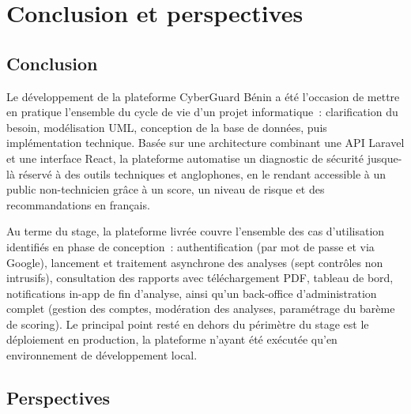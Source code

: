 \chapter*{Conclusion et perspectives}

\section{Conclusion}

Le d\'eveloppement de la plateforme CyberGuard B\'enin a \'et\'e l'occasion de mettre
en pratique l'ensemble du cycle de vie d'un projet informatique~: clarification
du besoin, mod\'elisation UML, conception de la base de donn\'ees, puis
impl\'ementation technique. Bas\'ee sur une architecture combinant une API Laravel
et une interface React, la plateforme automatise un diagnostic de s\'ecurit\'e
jusque-l\`a r\'eserv\'e \`a des outils techniques et anglophones, en le rendant
accessible \`a un public non-technicien gr\^ace \`a un score, un niveau de risque et
des recommandations en fran\c{c}ais.

Au terme du stage, la plateforme livr\'ee couvre l'ensemble des cas d'utilisation
identifi\'es en phase de conception~: authentification (par mot de passe et via
Google), lancement et traitement asynchrone des analyses (sept contr\^oles non
intrusifs), consultation des rapports avec t\'el\'echargement PDF, tableau de
bord, notifications in-app de fin d'analyse, ainsi qu'un back-office
d'administration complet (gestion des comptes, mod\'eration des analyses,
param\'etrage du bar\`eme de scoring). Le principal point rest\'e en dehors du
p\'erim\`etre du stage est le d\'eploiement en production, la plateforme n'ayant
\'et\'e ex\'ecut\'ee qu'en environnement de d\'eveloppement local.

\section{Perspectives}

